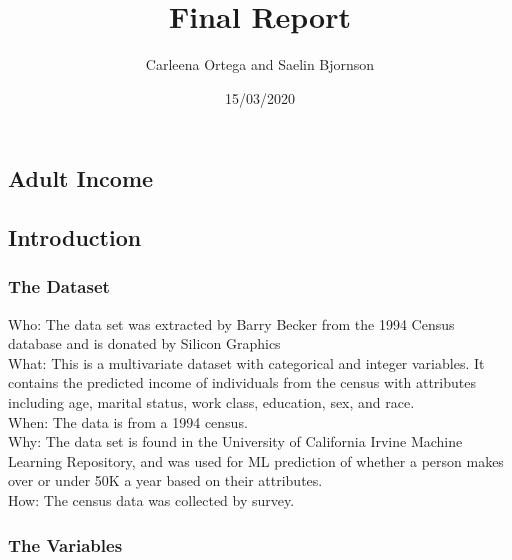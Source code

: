 \documentclass[]{article}
\title{Final Report}
\author{Carleena Ortega and Saelin Bjornson}
\date{15/03/2020}
\begin{document}
\maketitle

{
\setcounter{tocdepth}{4}
\tableofcontents
}
\hypertarget{adult-income}{%
\subsection{Adult Income}\label{adult-income}}

\hypertarget{introduction}{%
\subsection{Introduction}\label{introduction}}

\hypertarget{the-dataset}{%
\subsubsection{The Dataset}\label{the-dataset}}

Who: The data set was extracted by Barry Becker from the 1994 Census
database and is donated by Silicon Graphics\\
What: This is a multivariate dataset with categorical and integer
variables. It contains the predicted income of individuals from the
census with attributes including age, marital status, work class,
education, sex, and race.\\
When: The data is from a 1994 census.\\
Why: The data set is found in the University of California Irvine
Machine Learning Repository, and was used for ML prediction of whether a
person makes over or under 50K a year based on their attributes.\\
How: The census data was collected by survey.

\hypertarget{the-variables}{%
\subsubsection{The Variables}\label{the-variables}}
\end{document}
